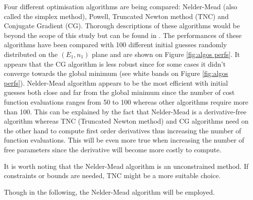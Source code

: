 Four different optimisation algorithms are being compared: 
Nelder-Mead (also called the simplex method), Powell, Truncated Newton method (TNC) and Conjugate Gradient (CG).
Thorough descriptions of these algorithms would be beyond the scope of this study but can be found in .
The performances of these algorithms have been compared with 100 different initial guesses randomly distributed on the $(E_1,n_1)$ plane and are shown on Figure \ref{fig:algos perfs}.
It appears that the CG algorithm is less robust since for some cases it didn't converge towards the global minimum (see white bands on Figure \ref{fig:algos perfs}).
Nelder-Mead algorithm appears to be the most efficient with initial guesses both close and far from the global minimum since the number of cost function evaluations ranges from 50 to 100 whereas other algorithms require more than 100.
This can be explained by the fact that Nelder-Mead is a derivative-free algorithm whereas TNC (Truncated Newton method) and CG algorithms need on the other hand to compute first order derivatives thus increasing the number of function evaluations.
This will be even more true when increasing the number of free parameters since the derivative will become more costly to compute.

It is worth noting that the Nelder-Mead algorithm is an unconstrained method.
If constraints or bounds are needed, TNC might be a more suitable choice.

Though in the following, the Nelder-Mead algorithm will be employed.
